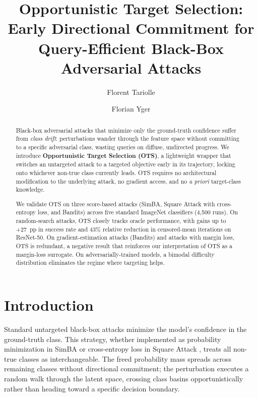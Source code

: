 \documentclass{cap2026}
\title{Opportunistic Target Selection: Early Directional Commitment for Query-Efficient Black-Box Adversarial Attacks}
\author[1]{Florent Tariolle}
\author[1,2]{Florian Yger}
\affil[1]{INSA Rouen Normandy}
\affil[2]{LITIS}
\begin{document}
\maketitle

\begin{abstract}
Black-box adversarial attacks that minimize only the ground-truth confidence suffer from \textit{class drift}: perturbations wander through the feature space without committing to a specific adversarial class, wasting queries on diffuse, undirected progress. We introduce \textbf{Opportunistic Target Selection (OTS)}, a lightweight wrapper that switches an untargeted attack to a targeted objective early in its trajectory, locking onto whichever non-true class currently leads. OTS requires no architectural modification to the underlying attack, no gradient access, and no \textit{a priori} target-class knowledge.

We validate OTS on three score-based attacks (SimBA, Square Attack with cross-entropy loss, and Bandits) across five standard ImageNet classifiers (4,500 runs). On random-search attacks, OTS closely tracks oracle performance, with gains up to +27~pp in success rate and 43\% relative reduction in censored-mean iterations on ResNet-50. On gradient-estimation attacks (Bandits) and attacks with margin loss, OTS is redundant, a negative result that reinforces our interpretation of OTS as a margin-loss surrogate. On adversarially-trained models, a bimodal difficulty distribution eliminates the regime where targeting helps.

\medskip
{}
\end{abstract}

\section{Introduction}\label{sec:introduction}

Standard untargeted black-box attacks minimize the model's confidence in the ground-truth class. This strategy, whether implemented as probability minimization in SimBA \citep{guo2019simple} or cross-entropy loss in Square Attack \citep{andriushchenko2020square}, treats all non-true classes as interchangeable. The freed probability mass spreads across remaining classes without directional commitment; the perturbation executes a random walk through the latent space, crossing class basins opportunistically rather than heading toward a specific decision boundary.
\end{document}

